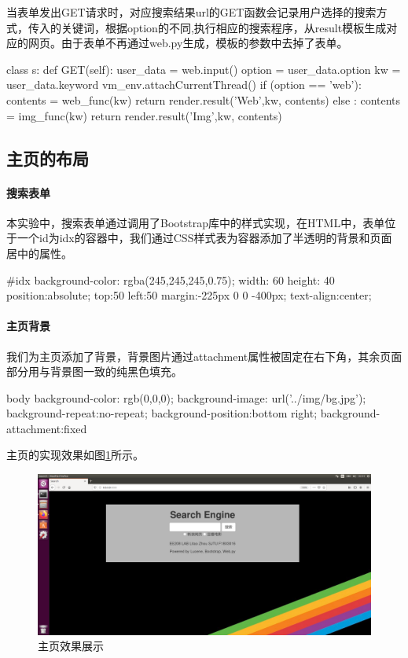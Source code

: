 \documentclass{article}
\begin{document}
当表单发出GET请求时，对应搜索结果url的GET函数会记录用户选择的搜索方式，传入的关键词，根据option的不同,执行相应的搜索程序，从result模板生成对应的网页。由于表单不再通过web.py生成，模板的参数中去掉了表单。
\begin{python}
class s:
    def GET(self):
        user_data = web.input()
        option = user_data.option     %
        kw = user_data.keyword        %
        vm_env.attachCurrentThread()
        if (option == 'web'):
            contents = web_func(kw)   %
            return render.result('Web',kw, contents) %
        else :
            contents = img_func(kw)
            return render.result('Img',kw, contents)
\end{python}

\subsection{主页的布局}

\paragraph{搜索表单} 本实验中，搜索表单通过调用了Bootstrap库中的样式实现，在HTML中，表单位于一个id为idx的容器中，我们通过CSS样式表为容器添加了半透明的背景和页面居中的属性。
\begin{python}
#idx
{
	background-color: rgba(245,245,245,0.75);
	width: 60%
	height: 40%
	position:absolute;
    top:50%
    left:50%
    margin:-225px 0 0 -400px;
    text-align:center;
}
\end{python}

\paragraph{主页背景} 我们为主页添加了背景，背景图片通过attachment属性被固定在右下角，其余页面部分用与背景图一致的纯黑色填充。
\begin{python}
body {
	background-color: rgb(0,0,0);
	background-image: url('../img/bg.jpg');
	background-repeat:no-repeat;
    background-position:bottom right;
	background-attachment:fixed
}
\end{python}

主页的实现效果如图\ref{fig:idx}所示。

\begin{figure}[htbp]
\centering
\includegraphics[width=13.5cm]{img/index.png}
\caption{主页效果展示}
\label{fig:idx}
\end{figure}
\end{document}
